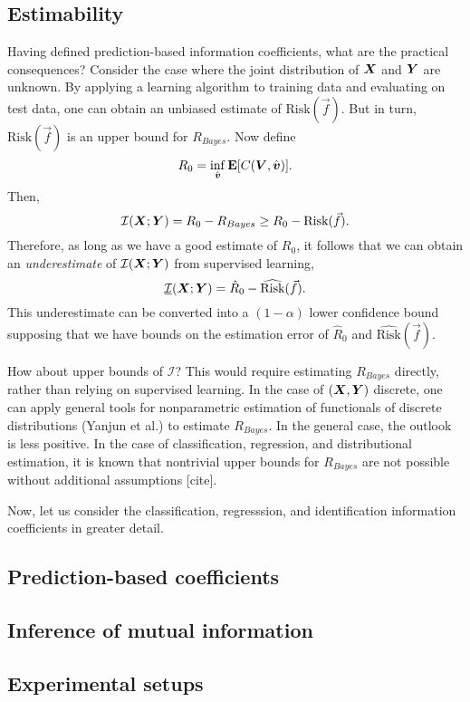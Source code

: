 \documentclass[12pt]{article}
\begin{document}
\subsection{Estimability}\label{sec:estimability}

Having defined prediction-based information coefficients, what are the
practical consequences?  Consider the case where the joint
distribution of $\boldsymbol{X}$ and $\boldsymbol{Y}$ are unknown.  By applying a learning
algorithm to training data and evaluating on test data, one can obtain
an unbiased estimate of $\text{Risk}(\vec{f})$.  But in turn,
$\text{Risk}(\vec{f})$ is an upper bound for $R_{Bayes}$.  
Now define
\[
R_0 = \inf_{\hat{\boldsymbol{v}}} \textbf{E}[C(\boldsymbol{V}, \hat{\boldsymbol{v}})].
\]
Then,
\[
\mathcal{I}(\boldsymbol{X}; \boldsymbol{Y}) =  R_0 - R_{Bayes} \geq R_0 - \text{Risk}(\vec{f}).
\]
Therefore, as long as we have a good estimate of $R_0$, it follows
that we can obtain an \emph{underestimate} of $\mathcal{I}(\boldsymbol{X}; \boldsymbol{Y})$
from supervised learning,
\[
\underline{\mathcal{I}}(\boldsymbol{X}; \boldsymbol{Y}) = \hat{R}_0 - \widehat{\text{Risk}}(\vec{f}).
\]
This underestimate can be converted into a $(1-\alpha)$ lower
confidence bound supposing that we have bounds on the estimation error
of $\hat{R}_0$ and $\widehat{\text{Risk}}(\vec{f})$.

How about upper bounds of $\mathcal{I}$?  This would require
estimating $R_{Bayes}$ directly, rather than relying on supervised
learning.  In the case of $(\boldsymbol{X},\boldsymbol{Y})$ discrete, one can apply general
tools for nonparametric estimation of functionals of discrete
distributions (Yanjun et al.) to estimate $R_{Bayes}$.  In the general
case, the outlook is less positive.  In the case of classification,
regression, and distributional estimation, it is known that nontrivial
upper bounds for $R_{Bayes}$ are not possible without additional
assumptions [cite].

Now, let us consider the classification, regresssion, and
identification information coefficients in greater detail.

\subsection{Prediction-based coefficients}

\subsection{Inference of mutual information}

\subsection{Experimental setups}
\end{document}
